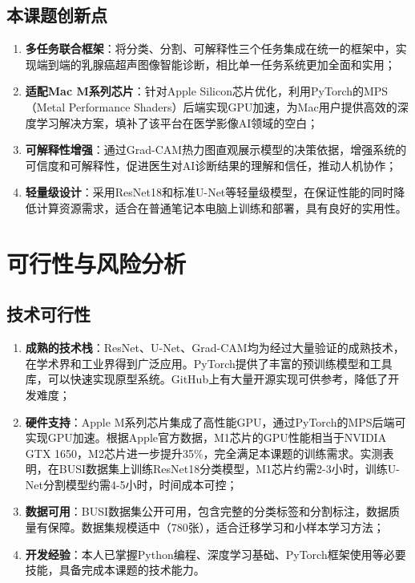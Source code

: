 \documentclass[supercite]{Hust-undergraduate-kaiti}
\theoremstyle{definition}
\begin{document}
\subsection{本课题创新点}

\begin{enumerate}
    \item \textbf{多任务联合框架}：将分类、分割、可解释性三个任务集成在统一的框架中，实现端到端的乳腺癌超声图像智能诊断，相比单一任务系统更加全面和实用；
    
    \item \textbf{适配Mac M系列芯片}：针对Apple Silicon芯片优化，利用PyTorch的MPS（Metal Performance Shaders）后端实现GPU加速，为Mac用户提供高效的深度学习解决方案，填补了该平台在医学影像AI领域的空白；
    
    \item \textbf{可解释性增强}：通过Grad-CAM热力图直观展示模型的决策依据，增强系统的可信度和可解释性，促进医生对AI诊断结果的理解和信任，推动人机协作；
    
    \item \textbf{轻量级设计}：采用ResNet18和标准U-Net等轻量级模型，在保证性能的同时降低计算资源需求，适合在普通笔记本电脑上训练和部署，具有良好的实用性。
\end{enumerate}

\section{可行性与风险分析}

\subsection{技术可行性}

\begin{enumerate}
    \item \textbf{成熟的技术栈}：ResNet、U-Net、Grad-CAM均为经过大量验证的成熟技术，在学术界和工业界得到广泛应用。PyTorch提供了丰富的预训练模型和工具库，可以快速实现原型系统。GitHub上有大量开源实现可供参考，降低了开发难度；
    
    \item \textbf{硬件支持}：Apple M系列芯片集成了高性能GPU，通过PyTorch的MPS后端可实现GPU加速。根据Apple官方数据，M1芯片的GPU性能相当于NVIDIA GTX 1650，M2芯片进一步提升35\%，完全满足本课题的训练需求。实测表明，在BUSI数据集上训练ResNet18分类模型，M1芯片约需2-3小时，训练U-Net分割模型约需4-5小时，时间成本可控；
    
    \item \textbf{数据可用}：BUSI数据集公开可用，包含完整的分类标签和分割标注，数据质量有保障。数据集规模适中（780张），适合迁移学习和小样本学习方法；
    
    \item \textbf{开发经验}：本人已掌握Python编程、深度学习基础、PyTorch框架使用等必要技能，具备完成本课题的技术能力。
\end{enumerate}
\end{document}
